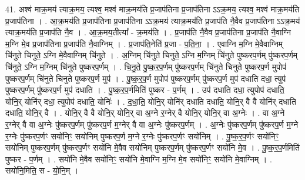 \documentclass[17pt]{extarticle}
\begin{document}
41. अश्व॑ माक्र॒मय॑ त्याक्र॒मय॒ त्यश्व॒ मश्व॑ माक्र॒मय॑ति प्र॒जाप॑तिना प्र॒जाप॑तिना ऽऽक्र॒मय॒ त्यश्व॒ मश्व॑ माक्र॒मय॑ति प्र॒जाप॑तिना । . आ॒क्र॒मय॑ति प्र॒जाप॑तिना प्र॒जाप॑तिना ऽऽक्र॒मय॑ त्याक्र॒मय॑ति प्र॒जाप॑ति नै॒वैव प्र॒जाप॑तिना ऽऽक्र॒मय॑ त्याक्र॒मय॑ति प्र॒जाप॑ति नै॒व । . आ॒क्र॒मय॒तीत्या᳚ - क्र॒मय॑ति । . प्र॒जाप॑ति नै॒वैव प्र॒जाप॑तिना प्र॒जाप॑ति नै॒वाग्नि म॒ग्नि मे॒व प्र॒जाप॑तिना प्र॒जाप॑ति नै॒वाग्निम् । . प्र॒जाप॑ति॒नेति॑ प्र॒जा - प॒ति॒ना॒ । . ए॒वाग्नि म॒ग्नि मे॒वैवाग्निम् चि॑नुते चिनुते॒ ऽग्नि मे॒वैवाग्निम् चि॑नुते । . अ॒ग्निम् चि॑नुते चिनुते॒ ऽग्नि म॒ग्निम् चि॑नुते पुष्करप॒र्णम् पु॑ष्करप॒र्णम् चि॑नुते॒ ऽग्नि म॒ग्निम् चि॑नुते पुष्करप॒र्णम् । . चि॒नु॒ते॒ पु॒ष्क॒र॒प॒र्णम् पु॑ष्करप॒र्णम् चि॑नुते चिनुते पुष्करप॒र्ण मुपोप॑ पुष्करप॒र्णम् चि॑नुते चिनुते पुष्करप॒र्ण मुप॑ । . पु॒ष्क॒र॒प॒र्ण मुपोप॑ पुष्करप॒र्णम् पु॑ष्करप॒र्ण मुप॑ दधाति दधा॒ त्युप॑ पुष्करप॒र्णम् पु॑ष्करप॒र्ण मुप॑ दधाति । . पु॒ष्क॒र॒प॒र्णमिति॑ पुष्कर - प॒र्णम् । . उप॑ दधाति दधा॒ त्युपोप॑ दधाति॒ योनि॒र् योनि॑र् दधा॒ त्युपोप॑ दधाति॒ योनिः॑ । . द॒धा॒ति॒ योनि॒र् योनि॑र् दधाति दधाति॒ योनि॒र् वै वै योनि॑र् दधाति दधाति॒ योनि॒र् वै । . योनि॒र् वै वै योनि॒र् योनि॒र् वा अ॒ग्ने र॒ग्नेर् वै योनि॒र् योनि॒र् वा अ॒ग्नेः । . वा अ॒ग्ने र॒ग्नेर् वै वा अ॒ग्नेः पु॑ष्करप॒र्णम् पु॑ष्करप॒र्ण म॒ग्नेर् वै वा अ॒ग्नेः पु॑ष्करप॒र्णम् । . अ॒ग्नेः पु॑ष्करप॒र्णम् पु॑ष्करप॒र्ण म॒ग्ने र॒ग्नेः पु॑ष्करप॒र्णꣳ सयो॑निꣳ॒॒ सयो॑निम् पुष्करप॒र्ण म॒ग्ने र॒ग्नेः पु॑ष्करप॒र्णꣳ सयो॑निम् । . पु॒ष्क॒र॒प॒र्णꣳ सयो॑निꣳ॒॒ सयो॑निम् पुष्करप॒र्णम् पु॑ष्करप॒र्णꣳ सयो॑नि मे॒वैव सयो॑निम् पुष्करप॒र्णम् पु॑ष्करप॒र्णꣳ सयो॑नि मे॒व । . पु॒ष्क॒र॒प॒र्णमिति॑ पुष्कर - प॒र्णम् । . सयो॑नि मे॒वैव सयो॑निꣳ॒॒ सयो॑नि मे॒वाग्नि म॒ग्नि मे॒व सयो॑निꣳ॒॒ सयो॑नि मे॒वाग्निम् । . सयो॑नि॒मिति॒ स - यो॒नि॒म् । \newline
\end{document}
